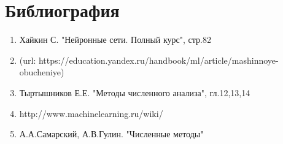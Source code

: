 \documentclass{article}
\begin{document}
\section{Библиография}
\begin{enumerate}
    \item Хайкин С. "Нейронные сети. Полный курс", стр.82
    \item (url: https://education.yandex.ru/handbook/ml/article/mashinnoye-obucheniye)
    \item Тыртышников Е.Е. "Методы численного анализа", гл.12,13,14
    \item http://www.machinelearning.ru/wiki/
    \item А.А.Самарский, А.В.Гулин.  "Численные методы"
\end{enumerate}
\end{document}
